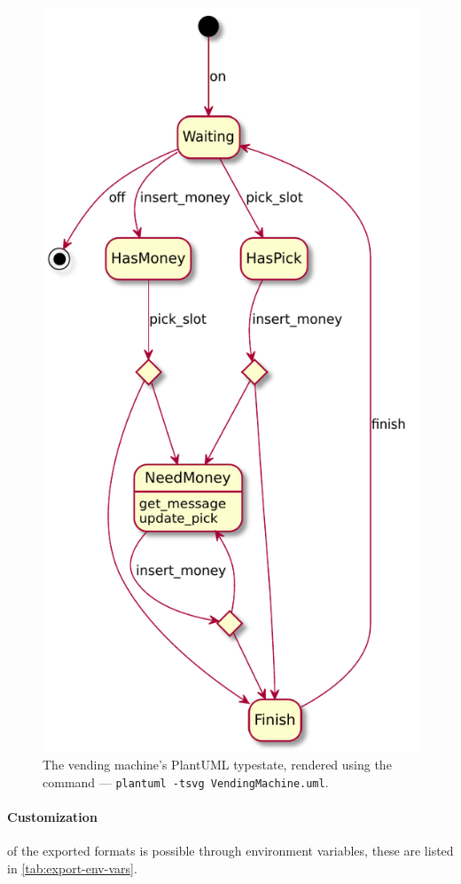 \begin{figure}
    \centering
    \includegraphics[width=0.5\linewidth]{Chapters/Figures/C4/VendingMachine.uml.pdf}
    \caption{The vending machine's PlantUML typestate, rendered using the command --- \texttt{plantuml -tsvg VendingMachine.uml}.}
    \label{fig:vending-machine-typestate-uml}
\end{figure}

\paragraph{Customization} of the exported formats is possible through environment variables,
these are listed in \autoref{tab:export-env-vars}.

